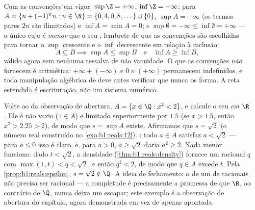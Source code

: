 \begin{example}\label{ex:b1:reals:extendedcompute}
Com as convenções em vigor: $\sup \Z = +\infty$, $\inf \Z =
-\infty$; para $A = \{n + (-1)^n n : n \in \N\} = \{0, 4, 0, 8,
\dots\} \cup \{0\}$, $\sup A = +\infty$ (os termos pares $2n$ são
ilimitados) e $\inf A = \min A = 0$; e $\sup\emptyset =
-\infty \leq \inf\emptyset = +\infty$ --- o único  cujo
 é \emph{menor} que o seu , lembrete de que as
convenções são escolhidas para tornar o $\sup$ crescente e o $\inf$
decrescente em relação à inclusão:
\[
A \subseteq B \implies \sup A \leq \sup B
\quad\text{e}\quad \inf A \geq \inf B ,
\]
válido agora sem nenhuma ressalva de não vacuidade. O que as convenções
\emph{não} fornecem é aritmética: $+\infty + (-\infty)$ e $0
\times (+\infty)$ permanecem indefinidos, e toda manipulação algébrica de
 deve antes verificar que nunca os forma.
A reta estendida é escrituração, não um sistema numérico.
\end{example}

\begin{example}\label{ex:b1:reals:supescape}
Volte ao  da observação de abertura, $A = \{x \in \Q : x^2 <
2\}$, e calcule o seu  \emph{em $\R$}. Ele é não vazio
($1 \in A$) e limitado superiormente por $1.5$ (se $x > 1.5$, então $x^2 >
2.25 > 2$), de modo que $s = \sup A$ existe. Afirmamos que $s = \sqrt 2$ (o
número real construído no \cref{exo:b1:reals:12}). : todo
$a \in A$ satisfaz $a < \sqrt2$ --- para $a \leq 0$ isso é
claro, e, para $a > 0$, $a \geq \sqrt2$ daria $a^2 \geq 2$.
Nada menor funciona: dado $t < \sqrt2$, a densidade
(\cref{thm:b1:reals:density}) fornece um racional $q$ com
$\max(1, t) < q < \sqrt 2$, e então $q^2 < 2$, de modo que $q \in A$
excede $t$. Pela \cref{prop:b1:reals:epsilon}, $s = \sqrt2
\notin \Q$. A ideia de fechamento: o  de um  de
racionais não precisa ser racional --- a completude é precisamente a
promessa de que $\R$, ao contrário de $\Q$, nunca deixa um 
escapar; este exemplo é a observação de abertura do capítulo, agora
demonstrada em vez de apenas apontada.
\end{example}

